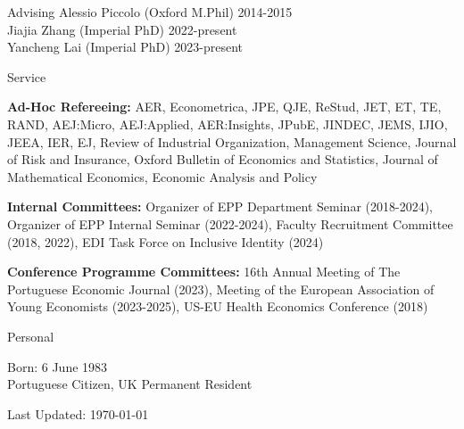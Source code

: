 \documentclass{resume}
\begin{document}
\begin{rSection}{Advising}
	Alessio Piccolo (Oxford M.Phil) \hfill {2014-2015} \\
	Jiajia Zhang (Imperial PhD) \hfill {2022-present} \\
	Yancheng Lai (Imperial PhD) \hfill {2023-present} \\
			
\end{rSection}




\begin{rSection}{Service}

\textbf{Ad-Hoc Refereeing:} AER, Econometrica, JPE, QJE, ReStud, 
JET, ET, TE, RAND, AEJ:Micro, AEJ:Applied, AER:Insights, 
JPubE, JINDEC, JEMS, IJIO, JEEA, IER, EJ, 
Review of Industrial Organization, Management Science, 
Journal of Risk and Insurance, Oxford Bulletin of Economics and Statistics, 
Journal of Mathematical Economics, Economic Analysis and Policy


\textbf{Internal Committees:} Organizer of EPP Department Seminar (2018-2024), 
Organizer of EPP Internal Seminar  (2022-2024), 
Faculty Recruitment Committee (2018, 2022), 
EDI Task Force on Inclusive Identity (2024)

\textbf{Conference Programme Committees:} 16th Annual Meeting of The Portuguese Economic Journal (2023), 
Meeting of the European Association of Young Economists (2023-2025), 
US-EU Health Economics Conference (2018)
	
\end{rSection}




\begin{rSection}{Personal}

Born: 6 June 1983
\\ Portuguese Citizen, UK Permanent Resident

\end{rSection}


\vspace{1em}
\begin{center}
\scriptsize{Last Updated: \today}	
\end{center}
\end{document}
